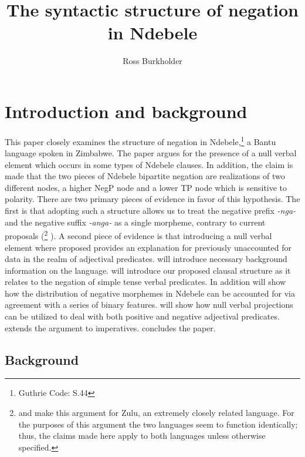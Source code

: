 \documentclass[output=paper]{langsci/langscibook}
\title{The syntactic structure of negation in Ndebele}
\author{%
 Ross Burkholder \affiliation{University of Chicago}
}
\newcommand{\nga}[0]{\textit {-nga- }}
\begin{document}

 

  

\section{Introduction and background}

This paper closely examines the structure of negation in Ndebele,\footnote{Guthrie Code: S.44} a Bantu language spoken in Zimbabwe. The paper argues for the presence of a null verbal element which occurs in some types of Ndebele clauses. In addition, the claim is made that the two pieces of Ndebele bipartite negation are realizations of two different nodes, a higher NegP node and a lower TP node which is sensitive to polarity. There are two primary pieces of evidence in favor of this hypothesis. The first is that adopting such a structure allows us to treat the negative prefix \nga and the negative suffix \textit{-anga-} as a single morpheme, contrary to current proposals (\citet{Buell2004,Buell2005}\footnote{\citet{Buell2004} and \citeyear{Buell2005} make this argument for Zulu, an extremely closely related language. For the purposes of this argument the two languages seem to function identically; thus, the claims made here apply to both languages unless otherwise specified.} \citealt{Khumalo1981,Kumalo1982,Sibanda2004}). A second piece of evidence is that introducing a null verbal element where proposed provides an explanation for previously unaccounted for data in the realm of adjectival predicates.  will introduce necessary background information on the language.   will introduce our proposed clausal structure as it relates to the negation of simple tense verbal predicates. In addition  will show how the distribution of negative morphemes in Ndebele can be accounted for via agreement with a series of binary features.  will show how null verbal projections can be utilized to deal with both positive and negative adjectival predicates.  extends the argument to imperatives.  concludes the paper. 


\subsection{Background}
\end{document}
